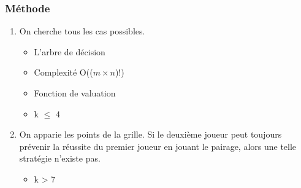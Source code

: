 \documentclass{beamer}
\begin{document}
\begin{frame}[t]
    \frametitle{Méthode}
    \begin{enumerate}
        \item On cherche tous les cas possibles.
            \begin{itemize}
                \item L'arbre de décision
                    \pause
                \item Complexité O(($m \times n$)!)
                    \pause
                \item{Fonction de valuation}
                    \pause
                \item k $\le$ 4
            \end{itemize}
        \item<6->On apparie les points de la grille. Si le deuxième joueur peut toujours prévenir la réussite du premier joueur en jouant le pairage, alors une telle stratégie n'existe pas.
            \begin{itemize}
                \item<7-> k > 7
            \end{itemize}

    \end{enumerate}
    \cleargoban
\end{frame}
\end{document}
